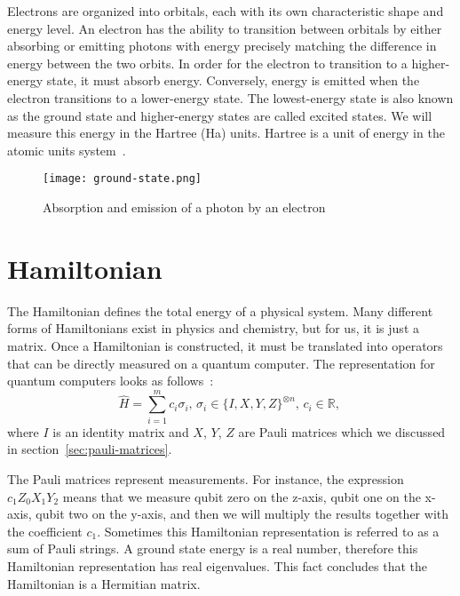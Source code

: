 Electrons are organized into orbitals, each with its own characteristic shape and energy level. An electron has the ability to transition between orbitals by either absorbing or emitting photons with energy precisely matching the difference in energy between the two orbits. In order for the electron to transition to a higher-energy state, it must absorb energy. Conversely, energy is emitted when the electron transitions to a lower-energy state. The lowest-energy state is also known as the ground state and higher-energy states are called excited states. We will measure this energy in the Hartree (Ha) units. Hartree is a unit of energy in the atomic units system~\cite{hartree}.

\begin{figure}[H]
    \centering
    \texttt{[image: ground-state.png]}
    \caption{Absorption and emission of a photon by an electron~\cite{img:ground-state}}
\end{figure}

\section{Hamiltonian}
The Hamiltonian defines the total energy of a physical system. Many different forms of Hamiltonians exist in physics and chemistry, but for us, it is just a matrix. Once a Hamiltonian is constructed, it must be translated into operators that can be directly measured on a quantum computer. The representation for quantum computers looks as follows~\cite{ibm_hamiltonian}:
\begin{equation}
\hat{H} = \sum_{i=1}^{m}c_i\sigma_i \text{, } \sigma_i \in \{I, X, Y, Z\}^{\otimes n}\text{, } c_i \in \mathbb{R} \text{, }
\end{equation}
where $I$ is an identity matrix and $X$, $Y$, $Z$ are Pauli matrices which we discussed in section~\ref{sec:pauli-matrices}.

The Pauli matrices represent measurements. For instance, the expression $c_{1}Z_{0}X_{1}Y_{2}$ means that we measure qubit zero on the z-axis, qubit one on the x-axis, qubit two on the y-axis, and then we will multiply the results together with the coefficient $c_{1}$. Sometimes this Hamiltonian representation is referred to as a sum of Pauli strings. A ground state energy is a real number, therefore this Hamiltonian representation has real eigenvalues. This fact concludes that the Hamiltonian is a Hermitian matrix.